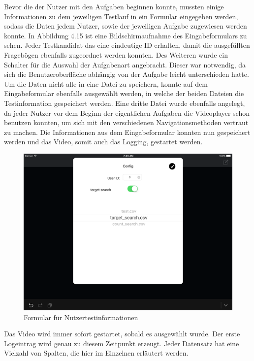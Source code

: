 \documentclass[11pt,a4paper]{report}
\begin{document}
Bevor die der Nutzer mit den Aufgaben beginnen konnte, mussten einige Informationen zu dem jeweiligen Testlauf in ein Formular eingegeben werden, sodass die Daten jedem Nutzer, sowie der jeweiligen Aufgabe zugewiesen werden konnte. In Abbildung 4.15 ist eine Bildschirmaufnahme des Eingabeformulars zu sehen. Jeder Testkandidat das eine eindeutige ID erhalten, damit die ausgefüllten Fragebögen ebenfalls zugeordnet werden konnten. Des Weiteren wurde ein Schalter für die Auswahl der Aufgabenart angebracht. Dieser war notwendig, da sich die Benutzeroberfläche abhängig von der Aufgabe leicht unterschieden hatte. Um die Daten nicht alle in eine Datei zu speichern, konnte auf dem Eingabeformular ebenfalls ausgewählt werden, in welche der beiden Dateien die Testinformation gespeichert werden. Eine dritte Datei wurde ebenfalls angelegt, da jeder Nutzer vor dem Beginn der eigentlichen Aufgaben die Videoplayer schon benutzen konnten, um sich mit den verschiedenen Navigationsmethoden vertraut zu machen. Die Informationen aus dem Eingabeformular konnten nun gespeichert werden und das Video, somit auch das Logging, gestartet werden.
\begin{figure}[h]
\begin{center}
\includegraphics[scale=1.2]{./images/30.png}
\caption{Formular für Nutzertestinformationen}
\label{formular_logging}
\end{center}
\end{figure}
Das Video wird immer sofort gestartet, sobald es ausgewählt wurde. Der erste Logeintrag wird genau zu diesem Zeitpunkt erzeugt. Jeder Datensatz hat eine Vielzahl von Spalten, die hier im Einzelnen erläutert werden.
\end{document}
